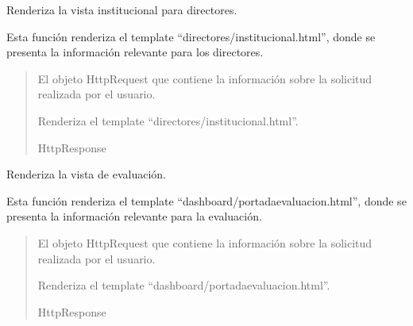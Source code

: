 \documentclass[letterpaper,10pt,spanish]{sphinxmanual}
\begin{document}
\begin{fulllineitems}

\pysigstartsignatures
{}
\pysigstopsignatures
\sphinxAtStartPar
Renderiza la vista institucional para directores.

\sphinxAtStartPar
Esta función renderiza el template “directores/institucional.html”,
donde se presenta la información relevante para los directores.
\begin{quote}\begin{description}
\sphinxAtStartPar
{} \textendash{} El objeto HttpRequest que contiene la información sobre la
solicitud realizada por el usuario.

\sphinxAtStartPar
Renderiza el template “directores/institucional.html”.

\sphinxAtStartPar
HttpResponse

\end{description}\end{quote}

\end{fulllineitems}



\begin{fulllineitems}

\pysigstartsignatures
{}
\pysigstopsignatures
\sphinxAtStartPar
Renderiza la vista de evaluación.

\sphinxAtStartPar
Esta función renderiza el template “dashboard/portadaevaluacion.html”,
donde se presenta la información relevante para la evaluación.
\begin{quote}\begin{description}
\sphinxAtStartPar
{} \textendash{} El objeto HttpRequest que contiene la información sobre la
solicitud realizada por el usuario.

\sphinxAtStartPar
Renderiza el template “dashboard/portadaevaluacion.html”.

\sphinxAtStartPar
HttpResponse

\end{description}\end{quote}

\end{fulllineitems}
\end{document}
